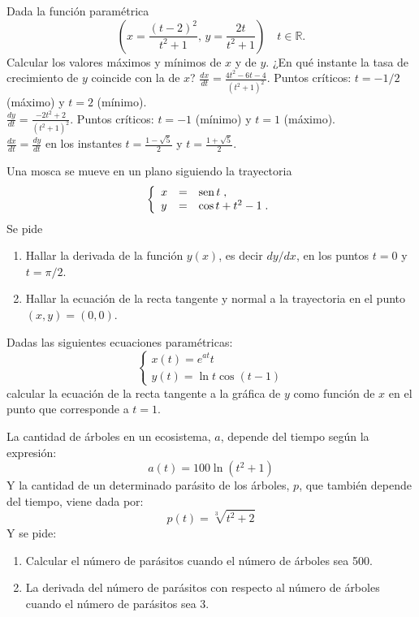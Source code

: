 { Dada la función paramétrica
\[
\left(
x =\frac{(t-2)^2}{t^2+1},\, y=\frac{2t}{t^2+1}
\right)
\quad t\in \mathbb{R}.
\]
Calcular los valores máximos y mínimos de $x$ y de $y$.
¿En qué instante la tasa de crecimiento de $y$ coincide con la de $x$?
}
{$\frac{dx}{dt}=\frac{4t^2-6t-4}{(t^2+1)^2}$. Puntos críticos: $t=-1/2$ (máximo) y $t=2$ (mínimo).\\
$\frac{dy}{dt}=\frac{-2t^2+2}{(t^2+1)^2}$. Puntos críticos: $t=-1$ (mínimo) y $t=1$ (máximo).\\
$\frac{dx}{dt}=\frac{dy}{dt}$ en los instantes $t=\frac{1-\sqrt 5}{2}$ y $t=\frac{1+\sqrt 5}{2}$.
}
{
}


{Una mosca se mueve en un plano siguiendo la trayectoria
\[
\left\{
\begin{array}{lll}
x & = & \operatorname{sen} t
\; ,
\\
y & = & \cos t + t^2 - 1
\; .
\end{array}
\right.
\]
Se pide
\begin{enumerate}
\item Hallar la derivada de la función $y(x)$, es decir $dy/dx$,
en los puntos $t=0$ y $t=\pi/2$.
\item Hallar la ecuación de la recta tangente y normal a la trayectoria
en el punto $(x,y)=(0,0)$.
\end{enumerate}
}


{Dadas las siguientes ecuaciones paramétricas:
\[
\left\{
\begin{array}{l}
x(t)=e^{at}t \\
y(t)=\ln t\cos (t-1)
\end{array}
\right.
\]
calcular la ecuación de la recta tangente a la gráfica de $y$ como función de $x$ en el punto que corresponde a $t=1$.
}


{La cantidad de árboles en un ecosistema, $a$, depende del tiempo según la expresión:
\[
a(t)=100\ln(t^2+1)
\]
Y la cantidad de un determinado parásito de los árboles, $p$, que también depende del tiempo, viene dada por:
\[
p(t) = \sqrt[3]{{t^2  + 2}}
\]
Y se pide:
\begin{enumerate}
\item Calcular el número de parásitos cuando el número de árboles sea 500.
\item La derivada del número de parásitos con respecto al número de árboles cuando el número de parásitos sea 3.
\end{enumerate}
}


